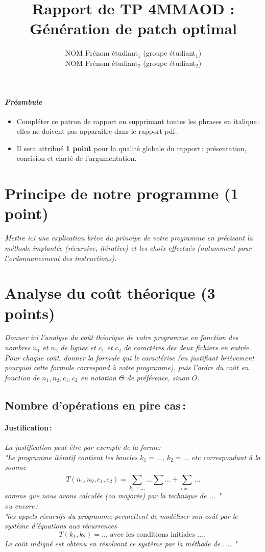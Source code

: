 \documentclass[a4paper, 10pt, french]{article}
\title{Rapport de TP 4MMAOD : Génération de patch optimal}
\author{
NOM Prénom étudiant$_1$ (groupe étudiant$_1$) 
\\ NOM Prénom étudiant$_2$ (groupe étudiant$_2$) 
}
\begin{document}
\maketitle

\paragraph{\em Préambule}
{\em \begin{itemize} 
   \item Compléter ce patron de rapport en supprimant toutes les phrases en italique\,: elles ne doivent pas apparaître dans le rapport pdf.
   \item Il sera attribué {\bf 1 point} pour la qualité globale du rapport\,: présentation, concision et clarté de l'argumentation.
\end{itemize}
}

\section{Principe de notre  programme (1 point)}
{\em Mettre ici une explication brève du principe de votre programme en  précisant la méthode implantée (récursive, itérative) et les
choix effectués (notamment pour l'ordonnancement des instructions).
} 

\section{Analyse du coût théorique (3 points)}
{\em Donner ici l'analyse du coût théorique de votre programme en fonction des nombres $n_1$ et $n_2$ de lignes 
et $c_1$ et $c_2$ de caractères des deux fichiers en entrée.
 Pour chaque coût, donner la formule qui le caractérise (en justifiant brièvement pourquoi cette formule correspond à votre programme), 
 puis l'ordre du coût en fonction de $n_1, n_2, c_1, c_2$ en notation $\Theta$ de préférence, sinon $O$.}

  \subsection{Nombre  d'opérations en pire cas\,: }
    \paragraph{Justification\,: }
    {\em La justification peut être par exemple de la forme: \\ 
       "Le programme itératif contient les boucles $k_1=...$, $k_2= ...$ etc correspondant à la somme 
      $$T(n_1, n_2, c_1, c_2) = \sum_{k_1=...}^{...} ... \sum ... + \sum_{i=...}^{...} ...$$ 
      somme que nous avons calculée (ou majorée) par la technique de  ... " \\
      ou  encore\,:  \\
      "les appels récursifs du programme permettent de modéliser son coût par le système d'équations aux récurrences 
      $$T(k_1, k_2) = ...  \mbox{~avec~les~conditions~initiales~....~} $$
      Le coût indiqué est obtenu en résolvant ce système par la méthode de  .... "
    } 
\end{document}
